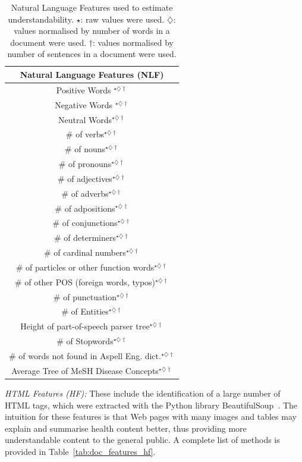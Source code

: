 \documentclass[10pt,a4paper]{article}
\begin{document}
\begin{table}
\caption{Natural Language Features used to estimate understandability. $\star$:
raw values were used. $\diamondsuit$: values normalised by number
of words in a document were used. $\dagger$: values normalised by
number of sentences in a document were used.}
\label{tab:doc_features_nlf} \vspace{-10pt}
\begin{tabular}{c}
\toprule 
\textbf{Natural Language Features (NLF)}\tabularnewline
\midrule 
Positive Words $^{\star\diamondsuit\dagger}$ \tabularnewline
Negative Words $^{\star\diamondsuit\dagger}$ \tabularnewline
Neutral Words$^{\star\diamondsuit\dagger}$ \tabularnewline
\# of verbs$^{\star\diamondsuit\dagger}$ \tabularnewline
\# of nouns$^{\star\diamondsuit\dagger}$ \tabularnewline
\# of pronouns$^{\star\diamondsuit\dagger}$ \tabularnewline
\# of adjectives$^{\star\diamondsuit\dagger}$ \tabularnewline
\# of adverbs$^{\star\diamondsuit\dagger}$ \tabularnewline
\# of adpositions$^{\star\diamondsuit\dagger}$ \tabularnewline
\# of conjunctions$^{\star\diamondsuit\dagger}$ \tabularnewline
\# of determiners$^{\star\diamondsuit\dagger}$ \tabularnewline
\# of cardinal numbers$^{\star\diamondsuit\dagger}$ \tabularnewline
\# of particles or other function words$^{\star\diamondsuit\dagger}$ \tabularnewline
\# of other POS (foreign words, typos)$^{\star\diamondsuit\dagger}$ \tabularnewline
\# of punctuation$^{\star\diamondsuit\dagger}$ \tabularnewline
\# of Entities$^{\star\diamondsuit\dagger}$ \tabularnewline
Height of part-of-speech parser tree$^{\star\diamondsuit\dagger}$ \tabularnewline
\# of Stopwords$^{\star\diamondsuit\dagger}$ \tabularnewline
\# of words not found in Aspell Eng. dict.$^{\star\diamondsuit\dagger}$ \tabularnewline
Average Tree of MeSH Disease Concepts$^{\star\diamondsuit\dagger}$ \tabularnewline
\bottomrule
\end{tabular}
\end{table}

\textit{HTML Features (HF):}
These include the identification of a large number of HTML tags, which were extracted with the Python library BeautifulSoup~\cite{bs4}. The intuition for these features is that Web pages with many images and tables may explain and summarise health content better, thus providing more understandable content to the general public.  A complete list of methods is provided in Table~\ref{tab:doc_features_hf}.
\end{document}
